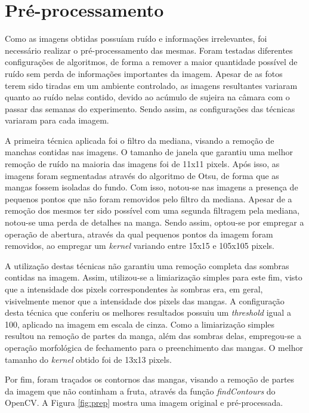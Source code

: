 \section{Pré-processamento}

Como as imagens obtidas possuíam ruído e informações irrelevantes, foi necessário realizar o pré-processamento das mesmas. Foram testadas diferentes configurações de algoritmos, de forma a remover a maior quantidade possível de ruído sem perda de informações importantes da imagem. Apesar de as fotos terem sido tiradas em um ambiente controlado, as imagens resultantes variaram quanto ao ruído nelas contido, devido ao acúmulo de sujeira na câmara com o passar das semanas do experimento. Sendo assim, as configurações das técnicas variaram para cada imagem.

A primeira técnica aplicada foi o filtro da mediana, visando a remoção de manchas contidas nas imagens. O tamanho de janela que garantiu uma melhor remoção de ruído na maioria das imagens foi de 11x11 pixels. Após isso, as imagens foram segmentadas através do algoritmo de Otsu, de forma que as mangas fossem isoladas do fundo. Com isso, notou-se nas imagens a presença de pequenos pontos que não foram removidos pelo filtro da mediana. Apesar de a remoção dos mesmos ter sido possível com uma segunda filtragem pela mediana, notou-se uma perda de detalhes na manga. Sendo assim, optou-se por empregar a operação de abertura, através da qual pequenos pontos da imagem foram removidos, ao empregar um \textit{kernel} variando entre 15x15 e 105x105 pixels. 

A utilização destas técnicas não garantiu uma remoção completa das sombras contidas na imagem. Assim, utilizou-se a limiarização simples para este fim, visto que a intensidade dos pixels correspondentes às sombras era, em geral, visivelmente menor que a intensidade dos pixels das mangas. A configuração desta técnica que conferiu os melhores resultados possuiu um \textit{threshold} igual a 100, aplicado na imagem em escala de cinza. Como a limiarização simples resultou na remoção de partes da manga, além das sombras delas, empregou-se a operação morfológica de fechamento para o preenchimento das mangas. O melhor tamanho do \textit{kernel} obtido foi de 13x13 pixels.

Por fim, foram traçados os contornos das mangas, visando a remoção de partes da imagem que não continham a fruta, através da função \textit{findContours} do OpenCV. A Figura \ref{fig:prep} mostra uma imagem original e pré-processada.

